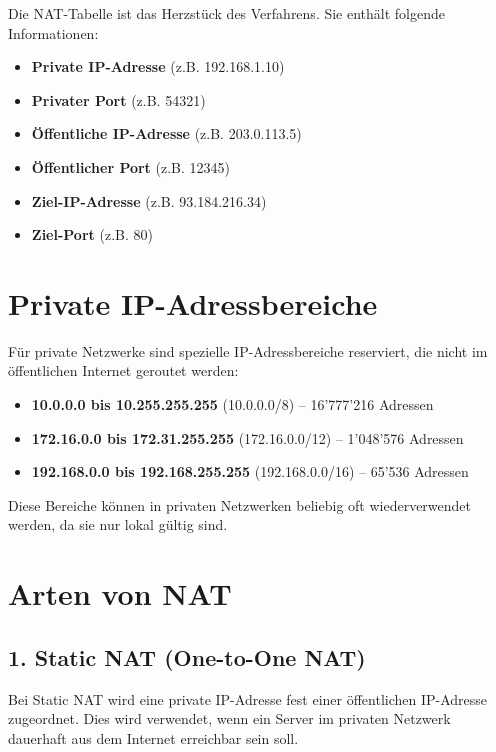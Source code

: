 \documentclass[
  nswissgerman,
  a4paper,
  DIV=11,
  numbers=noendperiod,
  ngerman]{scrreprt}
\providecommand{\tightlist}{%
  \setlength{\itemsep}{0pt}\setlength{\parskip}{0pt}}
\begin{document}
Die NAT-Tabelle ist das Herzstück des Verfahrens. Sie enthält folgende
Informationen:

\begin{itemize}
\tightlist
\item
  \textbf{Private IP-Adresse} (z.B. 192.168.1.10)
\item
  \textbf{Privater Port} (z.B. 54321)
\item
  \textbf{Öffentliche IP-Adresse} (z.B. 203.0.113.5)
\item
  \textbf{Öffentlicher Port} (z.B. 12345)
\item
  \textbf{Ziel-IP-Adresse} (z.B. 93.184.216.34)
\item
  \textbf{Ziel-Port} (z.B. 80)
\end{itemize}

\section{Private IP-Adressbereiche}\label{private-ip-adressbereiche}

Für private Netzwerke sind spezielle IP-Adressbereiche reserviert, die
nicht im öffentlichen Internet geroutet werden:

\begin{itemize}
\tightlist
\item
  \textbf{10.0.0.0 bis 10.255.255.255} (10.0.0.0/8) -- 16'777'216
  Adressen
\item
  \textbf{172.16.0.0 bis 172.31.255.255} (172.16.0.0/12) -- 1'048'576
  Adressen\\
\item
  \textbf{192.168.0.0 bis 192.168.255.255} (192.168.0.0/16) -- 65'536
  Adressen
\end{itemize}

Diese Bereiche können in privaten Netzwerken beliebig oft
wiederverwendet werden, da sie nur lokal gültig sind.

\section{Arten von NAT}\label{arten-von-nat}

\subsection{1. Static NAT (One-to-One
NAT)}\label{static-nat-one-to-one-nat}

Bei Static NAT wird eine private IP-Adresse fest einer öffentlichen
IP-Adresse zugeordnet. Dies wird verwendet, wenn ein Server im privaten
Netzwerk dauerhaft aus dem Internet erreichbar sein soll.
\end{document}
